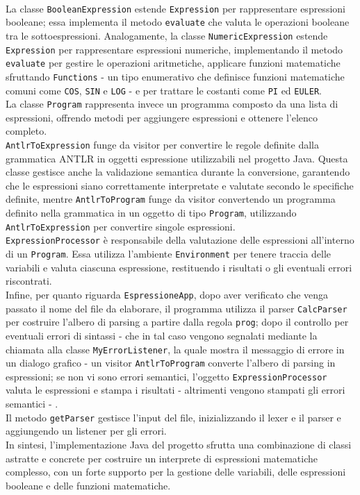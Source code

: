 \documentclass{article}
\begin{document}
\\\noindent
La classe \texttt{BooleanExpression} estende \texttt{Expression} per rappresentare espressioni booleane; essa implementa il metodo \texttt{evaluate} che valuta le operazioni booleane tra le sottoespressioni. Analogamente, la classe \texttt{NumericExpression} estende \texttt{Expression} per rappresentare espressioni numeriche, implementando il metodo \texttt{evaluate} per gestire le operazioni aritmetiche, applicare funzioni matematiche sfruttando \texttt{Functions} - un tipo enumerativo che definisce funzioni matematiche comuni come \texttt{COS}, \texttt{SIN} e \texttt{LOG} - e per trattare le costanti come \texttt{PI} ed \texttt{EULER}. 
\\\noindent
La classe \texttt{Program} rappresenta invece un programma composto da una lista di espressioni, offrendo metodi per aggiungere espressioni e ottenere l'elenco completo.
\\\noindent
\texttt{AntlrToExpression} funge da visitor per convertire le regole definite dalla grammatica ANTLR in oggetti espressione utilizzabili nel progetto Java. Questa classe gestisce anche la validazione semantica durante la conversione, garantendo che le espressioni siano correttamente interpretate e valutate secondo le specifiche definite, mentre \texttt{AntlrToProgram} funge da visitor convertendo un programma definito nella grammatica in un oggetto di tipo \texttt{Program}, utilizzando \texttt{AntlrToExpression} per convertire singole espressioni.
\\\noindent
\texttt{ExpressionProcessor} è responsabile della valutazione delle espressioni all'interno di un \texttt{Program}. Essa utilizza l'ambiente \texttt{Environment} per tenere traccia delle variabili e valuta ciascuna espressione, restituendo i risultati o gli eventuali errori riscontrati.
\\\noindent
Infine, per quanto riguarda \texttt{EspressioneApp}, dopo aver verificato che venga passato il nome del file da elaborare, il programma utilizza il 
parser \texttt{CalcParser} per costruire l'albero di parsing a partire dalla regola \texttt{prog}; dopo il controllo per eventuali errori di sintassi - che in tal caso vengono segnalati mediante la chiamata alla classe \texttt{MyErrorListener}, la quale mostra il messaggio di errore in un dialogo grafico - un visitor \texttt{AntlrToProgram} converte l'albero di parsing in espressioni; se non vi sono errori semantici, l'oggetto \texttt{ExpressionProcessor} valuta le espressioni e stampa i risultati - altrimenti vengono stampati gli errori semantici - .
\\\noindent
Il metodo \texttt{getParser} gestisce l'input del file, inizializzando il lexer e il parser e aggiungendo  un listener per gli errori.
\\\noindent
In sintesi, l'implementazione Java del progetto sfrutta una combinazione di classi astratte e concrete per costruire un interprete di espressioni matematiche complesso, con un forte supporto per la gestione delle variabili, delle espressioni booleane e delle funzioni matematiche.
\end{document}
